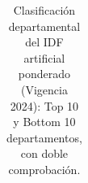 \documentclass[
  10pt,
  letterpaper,
  DIV=11,
  numbers=noendperiod]{scrartcl}
\begin{document}
\begin{longtable}[]{@{}
  >{\raggedright\arraybackslash}p{}
  >{\centering\arraybackslash}p{}
  >{\raggedright\arraybackslash}p{}
  >{\centering\arraybackslash}p{}
  >{\raggedleft\arraybackslash}p{}
  >{\raggedleft\arraybackslash}p{}
  >{\raggedleft\arraybackslash}p{}
  >{\raggedleft\arraybackslash}p{}@{}}

\caption{\label{tbl-ranking-idf-dpto}Clasificación departamental del IDF
artificial ponderado (Vigencia 2024): Top 10 y Bottom 10 departamentos,
con doble comprobación.}

\tabularnewline


\end{longtable}
\end{document}
